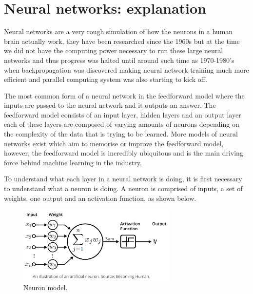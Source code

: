\documentclass[a4paper,oneside,phd,etd]{BYUPhys}
\begin{document}
\section{Neural networks: explanation}
Neural networks are a very rough simulation of how the neurons in a human brain actually work, they have been researched since the 1960s\cite{neural-network-history} but at the time we did not have the computing power necessary to run these large neural networks and thus progress was halted until around such time as 1970-1980's when backpropagation was discovered making neural network training much more efficient and parallel computing system was also starting to kick off.

The most common form of a neural network in the feedforward model where the inputs are passed to the neural network and it outputs an answer. The feedforward model consists of an input layer, hidden layers and an output layer each of these layers are composed of varying amounts of neurons depending on the complexity of the data that is trying to be learned. More models of neural networks exist which aim to memorise or improve the feedforward model, however, the feedforward model is incredibly ubiquitous and is the main driving force behind machine learning in the industry. 

To understand what each layer in a neural network is doing, it is first necessary to understand what a neuron is doing. A neuron is comprised of inputs, a set of weights, one output and an activation function, as shown below.
\begin{figure}[H]
\centering
\includegraphics[width=8cm]{pictures/neuron_model.png}
\caption{Neuron model\cite{fig:neuron_model}.}
\label{fig:neuron_model}
\end{figure}
\end{document}
